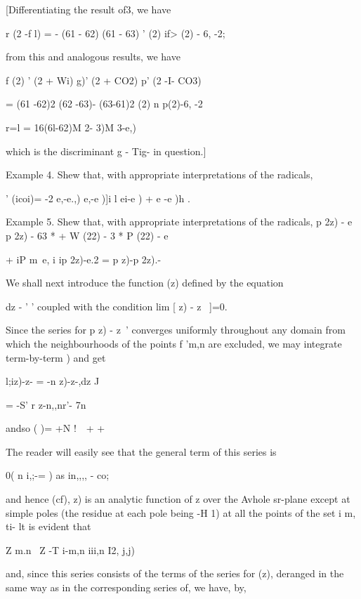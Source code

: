 {[Differentiating the result of3, we have

r (2 -f l) = - (61 - 62) (61 - 63) ' (2) if> (2) - 6, -2;

from this and analogous results, we have

f (2) ' (2 + Wi) g)' (2 + CO2) p' (2 -I- CO3)

= (61 -62)2 (62 -63)- (63-61)2 (2) n p(2)-6, -2

r=l = 16(6l-62)M 2- 3)M 3-e,)

which is the discriminant g - Tig- in question.]

%
%

Example 4. Shew that, with appropriate interpretations of the
radicals,

 ' (icoi)= -2 e,-e.,) e,-e )]i l ei-e ) + e -e )h .


Example 5. Shew that, with appropriate interpretations of the
radicals, p 2z) - e p 2z) - 63 * + W (22) - 3 * P (22) - e

+ iP m~e, i ip 2z)-e.2 = p z)-p 2z).-


We shall next introduce the function (z) defined by the equation

dz - ' ' coupled with the condition lim [ z) - z~ ]=0.

Since the series for p z) - z~' converges uniformly throughout any
domain from which the neighbourhoods of the points f 'm,n are
excluded, we may integrate term-by-term ) and get

l;iz)-z- = -n z)-z-,dz J

= -S' r z-n,,nr'- 7n%

andso ( )= +N !\ \ + +

The reader will easily see that the general term of this series is

0( n i,;-= ) as in,,,, - co;

and hence (cf), z) is an analytic function of z over the Avhole
sr-plane except at simple poles (the residue at each pole being -H 1)
at all the points of the set i m, ti- lt is evident that

Z m.n \ Z -T i-m,n iii,n I2, j,j)

and, since this series consists of the terms of the series for (z),
deranged in the same way as in the corresponding series of, we
have, by,

}
